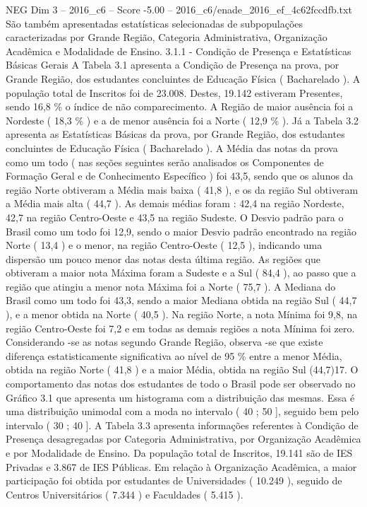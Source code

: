 \begin{textsample}{NEG Dim 3 – 2016\_c6 – Score -5.00 – 2016\_c6/enade\_2016\_ef\_4c62fccdfb.txt}
São também apresentadas estatísticas selecionadas de subpopulações caracterizadas por Grande Região, Categoria Administrativa, Organização Acadêmica e Modalidade de Ensino. 3.1.1 - Condição de Presença e Estatísticas Básicas Gerais A Tabela 3.1 apresenta a Condição de Presença na prova, por Grande Região, dos estudantes concluintes de Educação Física ( Bacharelado ).
A população total de Inscritos foi de 23.008.
Destes, 19.142 estiveram Presentes, sendo 16,8 \% o índice de não comparecimento.
A Região de maior ausência foi a Nordeste ( 18,3 \% ) e a de menor ausência foi a Norte ( 12,9 \% ).
Já a Tabela 3.2 apresenta as Estatísticas Básicas da prova, por Grande Região, dos estudantes concluintes de Educação Física ( Bacharelado ).
A Média das notas da prova como um todo ( nas seções seguintes serão analisados os Componentes de Formação Geral e de Conhecimento Específico ) foi 43,5, sendo que os alunos da região Norte obtiveram a Média mais baixa ( 41,8 ), e os da região Sul obtiveram a Média mais alta ( 44,7 ).
As demais médias foram : 42,4 na região Nordeste, 42,7 na região Centro-Oeste e 43,5 na região Sudeste.
O Desvio padrão para o Brasil como um todo foi 12,9, sendo o maior Desvio padrão encontrado na região Norte ( 13,4 ) e o menor, na região Centro-Oeste ( 12,5 ), indicando uma dispersão um pouco menor das notas desta última região.
As regiões que obtiveram a maior nota Máxima foram a Sudeste e a Sul ( 84,4 ), ao passo que a região que atingiu a menor nota Máxima foi a Norte ( 75,7 ).
A Mediana do Brasil como um todo foi 43,3, sendo a maior Mediana obtida na região Sul ( 44,7 ), e a menor obtida na Norte ( 40,5 ).
Na região Norte, a nota Mínima foi 9,8, na região Centro-Oeste foi 7,2 e em todas as demais regiões a nota Mínima foi zero.
Considerando -se as notas segundo Grande Região, observa -se que existe diferença estatisticamente significativa ao nível de 95 \% entre a menor Média, obtida na região Norte ( 41,8 ) e a maior Média, obtida na região Sul (44,7)17.
O comportamento das notas dos estudantes de todo o Brasil pode ser observado no Gráfico 3.1 que apresenta um histograma com a distribuição das mesmas.
Essa é uma distribuição unimodal com a moda no intervalo ( 40 ; 50 ], seguido bem pelo intervalo ( 30 ; 40 ].
A Tabela 3.3 apresenta informações referentes à Condição de Presença desagregadas por Categoria Administrativa, por Organização Acadêmica e por Modalidade de Ensino.
Da população total de Inscritos, 19.141 são de IES Privadas e 3.867 de IES Públicas.
Em relação à Organização Acadêmica, a maior participação foi obtida por estudantes de Universidades ( 10.249 ), seguido de Centros Universitários ( 7.344 ) e Faculdades ( 5.415 ).

\end{textsample}
